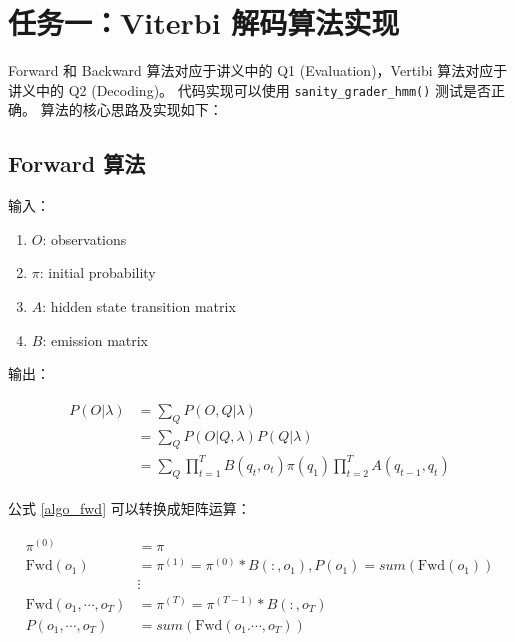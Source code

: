 \documentclass[degree=project, degree-type=project]{thuthesis}
\begin{document}
\maketitle

\frontmatter
% 

\tableofcontents

\listoffigures           %

\mainmatter

\chapter{任务一：Viterbi 解码算法实现}

Forward 和 Backward 算法对应于讲义中的 Q1 (Evaluation)，Vertibi 算法对应于讲义中的 Q2 (Decoding)。
代码实现可以使用 \texttt{sanity\_grader\_hmm()} 测试是否正确。
算法的核心思路及实现如下：

\section{Forward 算法}
  输入：

  \begin{enumerate}
    \item $O$: observations
    \item $\pi$: initial probability
    \item $A$: hidden state transition matrix
    \item $B$: emission matrix
  \end{enumerate}

  输出：

  \begin{align}
    \begin{split}
      P(O | \lambda) &= \sum_{Q} P(O, Q | \lambda) \\
      &= \sum_Q P(O | Q, \lambda) P(Q | \lambda) \\
      &= \sum_Q \prod_{t=1}^T B(q_t, o_t) \pi(q_1) \prod_{t=2}^T A(q_{t-1}, q_t)
    \end{split}
    \label{algo_fwd}
  \end{align}

  公式 \ref{algo_fwd} 可以转换成矩阵运算：

  \begin{align}
    \begin{split}
      \pi^{(0)} &= \pi \\
      \text{Fwd}(o_1) &= \pi^{(1)} = \pi^{(0)} * B(:, o_1), P(o_1) = sum(\text{Fwd}(o_1)) \\
      &\vdots \\
      \text{Fwd}(o_1, \cdots, o_T) &= \pi^{(T)} = \pi^{(T-1)} * B(:, o_T) \\
      P(o_1, \cdots, o_T) &= sum(\text{Fwd}(o_1. \cdots, o_T))
    \end{split}
  \end{align}
\end{document}
